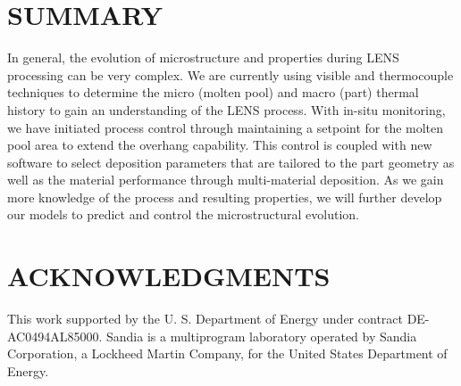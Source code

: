 \documentclass[10pt]{article}
\begin{document}
\section*{SUMMARY}
In general, the evolution of microstructure and properties during LENS processing can be very complex. We are currently using visible and thermocouple techniques to determine the micro (molten pool) and macro (part) thermal history to gain an understanding of the LENS process. With in-situ monitoring, we have initiated process control through maintaining a setpoint for the molten pool area to extend the overhang capability. This control is coupled with new software to select deposition parameters that are tailored to the part geometry as well as the material performance through multi-material deposition. As we gain more knowledge of the process and resulting properties, we will further develop our models to predict and control the microstructural evolution.

\section*{ACKNOWLEDGMENTS}
This work supported by the U. S. Department of Energy under contract DE-AC0494AL85000. Sandia is a multiprogram laboratory operated by Sandia Corporation, a Lockheed Martin Company, for the United States Department of Energy.
\end{document}
